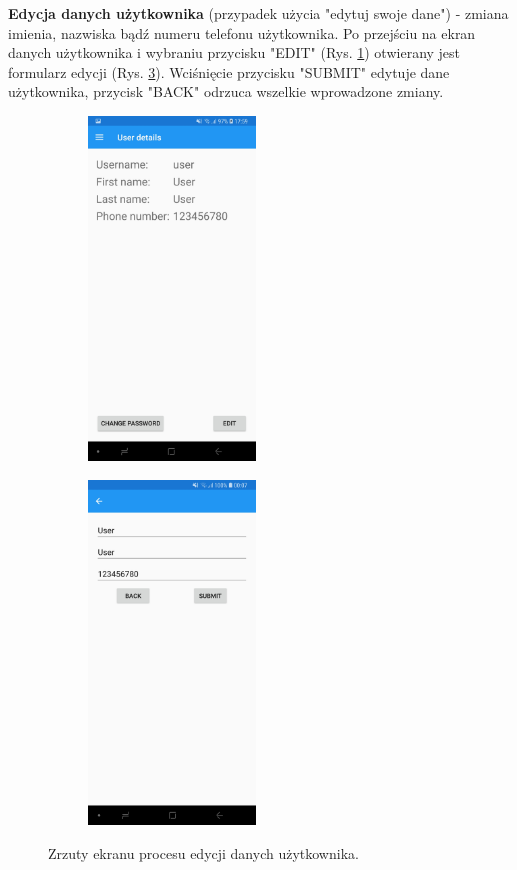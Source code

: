 \textbf{Edycja danych użytkownika} (przypadek użycia "edytuj swoje dane") - zmiana imienia, nazwiska bądź numeru telefonu użytkownika. Po przejściu na ekran danych użytkownika i wybraniu przycisku "EDIT" (Rys. \ref{uzytkownik_edit}) otwierany jest formularz edycji (Rys. \ref{edycja_uzytkownika}). Wciśnięcie przycisku "SUBMIT" edytuje dane użytkownika, przycisk "BACK" odrzuca wszelkie wprowadzone zmiany.
\begin{figure}[!ht]
	\begin{center}
		\begin{subfigure}[b]{0.3\textwidth}
			\includegraphics[width=1.75in]{img/mobile/uzytkownik.jpg}
			\label{uzytkownik_edit}
		\end{subfigure}
		\begin{subfigure}[b]{0.3\textwidth}
			\includegraphics[width=1.75in]{img/mobile/edycja_uzytkownika.jpg}
			\label{edycja_uzytkownika}
		\end{subfigure}
	\end{center}
	\caption{Zrzuty ekranu procesu edycji danych użytkownika.}
\end{figure}

